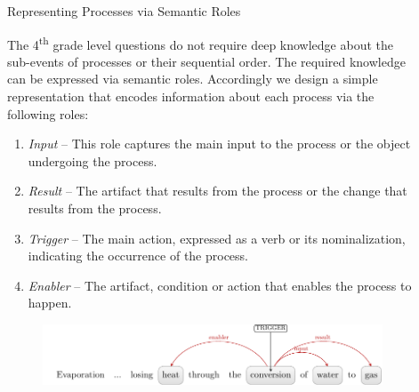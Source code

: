 \documentclass[final]{beamer}
\newlength{\sepwid}
\newlength{\onecolwid}
\begin{document}
\begin{frame}[t]
\begin{columns}[t]
\begin{column}{\onecolwid}

\end{column} %

\begin{column}{\sepwid}\end{column} %


\begin{column}{\onecolwid}


\begin{block}{Representing Processes via Semantic Roles}

The 4\textsuperscript{th} grade level questions do not require deep knowledge about the sub-events of processes or their sequential order. The required knowledge can be expressed via semantic roles. 
Accordingly we design a simple representation that encodes information about each process via the following roles:
\begin{enumerate}
\item {\em Input} -- This role captures the main input to the process or the object undergoing the process.
\item {\em Result} -- The artifact that results from the process or the change that results from the process.
\item {\em Trigger} -- The main action, expressed as a verb or its nominalization, indicating the occurrence of the process.
\item {\em Enabler} -- The artifact, condition or action that enables the process to happen.
\end{enumerate}


\begin{figure}
\includegraphics[width=\linewidth]{srl.pdf}
\end{figure}


\end{block}
\end{column}
\end{columns}
\end{frame}
\end{document}
